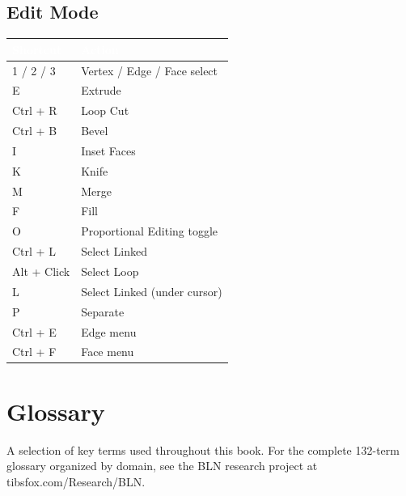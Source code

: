 \documentclass[11pt,letterpaper,twoside,openright]{book}
\newcommand{\tableheader}[1]{\textbf{\sffamily\textcolor{white}{#1}}}
\begin{document}
\section{Edit Mode}

\begin{shortcutbox}
\begin{center}
\begin{tabularx}{\textwidth}{L{3.5cm}X}
\toprule
{}
\tableheader{Shortcut} & \tableheader{Action} \\
 / 2 / 3 & Vertex / Edge / Face select \\
E & Extrude \\
Ctrl + R & Loop Cut \\
Ctrl + B & Bevel \\
I & Inset Faces \\
K & Knife \\
M & Merge \\
F & Fill \\
O & Proportional Editing toggle \\
Ctrl + L & Select Linked \\
Alt + Click & Select Loop \\
L & Select Linked (under cursor) \\
P & Separate \\
Ctrl + E & Edge menu \\
Ctrl + F & Face menu \\
\bottomrule
\end{tabularx}
\end{center}
\end{shortcutbox}



\chapter{Glossary}
\label{app:glossary}

A selection of key terms used throughout this book. For the complete 132-term glossary organized by domain, see the BLN research project at tibsfox.com/Research/BLN.
\end{document}
